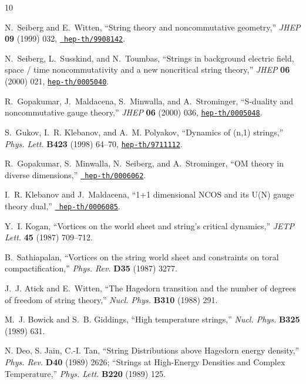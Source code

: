 \begingroup\raggedright\begin{thebibliography}{10}

N.~Seiberg and E.~Witten, ``String theory and noncommutative geometry,'' {\em
  JHEP} {\bf 09} (1999) 032, \href{http://xxx.lanl.gov/abs/hep-th/9908142}{{\tt
  hep-th/9908142}}.

N.~Seiberg, L.~Susskind, and N.~Toumbas, ``Strings in background electric
  field, space / time noncommutativity and a new noncritical string theory,''
  {\em JHEP} {\bf 06} (2000) 021,
  \href{http://xxx.lanl.gov/abs/hep-th/0005040}{{\tt hep-th/0005040}}.

R.~Gopakumar, J.~Maldacena, S.~Minwalla, and A.~Strominger, ``S-duality and
  noncommutative gauge theory,'' {\em JHEP} {\bf 06} (2000) 036,
  \href{http://xxx.lanl.gov/abs/hep-th/0005048}{{\tt hep-th/0005048}}.

S.~Gukov, I.~R. Klebanov, and A.~M. Polyakov, ``Dynamics of (n,1) strings,''
  {\em Phys. Lett.} {\bf B423} (1998) 64--70,
  \href{http://xxx.lanl.gov/abs/hep-th/9711112}{{\tt hep-th/9711112}}.

R.~Gopakumar, S.~Minwalla, N.~Seiberg, and A.~Strominger, ``OM theory in
  diverse dimensions,'' \href{http://xxx.lanl.gov/abs/hep-th/0006062}{{\tt
  hep-th/0006062}}.

I.~R. Klebanov and J.~Maldacena, ``1+1 dimensional NCOS and its U(N) gauge
  theory dual,'' \href{http://xxx.lanl.gov/abs/hep-th/0006085}{{\tt
  hep-th/0006085}}.

Y.~I. Kogan, ``Vortices on the world sheet and string's critical dynamics,''
  {\em JETP Lett.} {\bf 45} (1987) 709--712.

B.~Sathiapalan, ``Vortices on the string world sheet and constraints on toral
  compactification,'' {\em Phys. Rev.} {\bf D35} (1987) 3277.

J.~J. Atick and E.~Witten, ``The Hagedorn transition and the number of degrees
  of freedom of string theory,'' {\em Nucl. Phys.} {\bf B310} (1988) 291.

M.~J. Bowick and S.~B. Giddings, ``High temperature strings,'' {\em Nucl.
  Phys.} {\bf B325} (1989) 631.

N. Deo, S. Jain, C.-I. Tan, 
``String Distributions above Hagedorn energy density,''
{\em Phys. Rev.} {\bf D40} (1989) 2626;
``Strings at High-Energy Densities and Complex Temperature,''
{\em Phys. Lett.} {\bf B220} (1989) 125.
 

\end{thebibliography}
